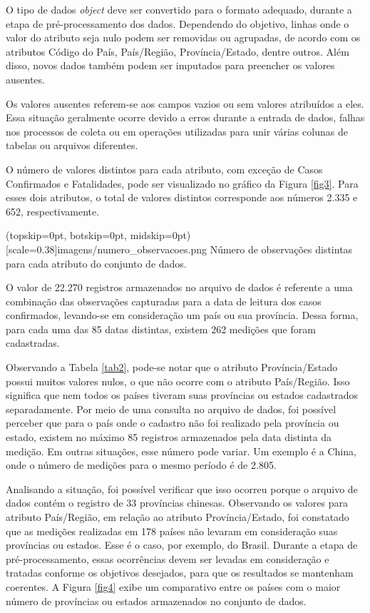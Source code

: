 \documentclass{ieeeaccess}
\begin{document}
O tipo de dados \textit{object} deve ser convertido para o formato adequado, durante a etapa de pré-processamento dos dados. Dependendo do objetivo, linhas onde o valor do atributo seja nulo podem ser removidas ou agrupadas, de acordo com os atributos Código do País,  País/Região,  Província/Estado, dentre outros. Além disso, novos dados também podem ser imputados para preencher os valores ausentes.

Os valores ausentes referem-se aos campos vazios ou sem valores atribuídos a eles. Essa situação geralmente ocorre devido a erros durante a entrada de dados, falhas nos processos de coleta ou em operações utilizadas para unir várias colunas de tabelas ou arquivos diferentes. 

O número de valores distintos para cada atributo, com exceção de Casos Confirmados e Fatalidades, pode ser visualizado no gráfico da Figura \ref{fig3}. Para esses dois atributos, o total de valores distintos corresponde aos números 2.335 e 652, respectivamente. 

\Figure[h!](topskip=0pt, botskip=0pt, midskip=0pt)[scale=0.38]{imagens/{numero_observacoes.png}}
{Número de observações distintas para cada atributo do conjunto de dados. \label{fig3}}

O valor de 22.270 registros armazenados no arquivo de dados é referente a uma combinação das observações capturadas para a data de leitura dos casos confirmados, levando-se em consideração um país ou sua província. Dessa forma, para cada uma das 85 datas distintas, existem 262 medições que foram cadastradas. 

Observando a Tabela \ref{tab2}, pode-se notar que o atributo Província/Estado possui muitos valores nulos, o que não ocorre com o atributo País/Região. Isso significa que nem todos os países tiveram suas províncias ou estados cadastrados separadamente. Por meio de uma consulta no arquivo de dados, foi possível perceber que para o país onde o cadastro não foi realizado pela província ou estado, existem no máximo 85 registros armazenados pela data distinta da medição. Em outras situações, esse número pode variar. Um exemplo é a China, onde o número de medições para o mesmo período é de 2.805. 

Analisando a situação, foi possível verificar que isso ocorreu porque o arquivo de dados contém o registro de 33 províncias chinesas. Observando os valores para  atributo País/Região, em relação ao atributo Província/Estado, foi constatado que as medições realizadas em 178 países não levaram em consideração suas províncias ou estados. Esse é o caso, por exemplo, do Brasil. Durante a etapa de pré-processamento, essas ocorrências devem ser levadas em consideração e tratadas conforme os objetivos desejados, para que os resultados se mantenham coerentes. A Figura \ref{fig4} exibe um comparativo entre os países com o maior número de províncias ou estados armazenados no conjunto de dados.
\end{document}
